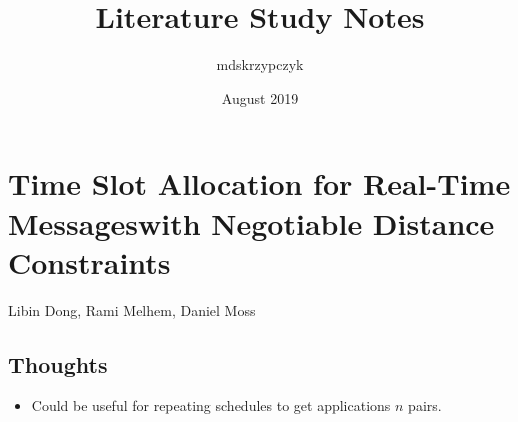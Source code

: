 \documentclass{article}
\title{Literature Study Notes}
\author{mdskrzypczyk }
\date{August 2019}
\begin{document}
\maketitle

\section{Time Slot Allocation for Real-Time Messageswith Negotiable Distance Constraints}
Libin Dong, Rami Melhem, Daniel Moss

\subsection{Thoughts}
\begin{itemize}
    \item Could be useful for repeating schedules to get applications $n$ pairs.
\end{itemize}
\end{document}

